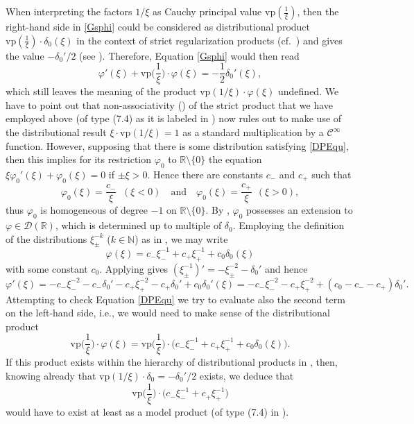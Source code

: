 \documentclass[sumlimits,intlimits,namelimits%
]{amsart}
\def\pg{\mathhexbox278}
\newcommand{\Cinf}{\ensuremath{\mathcal{C}^\infty}}
\newcommand{\D}{\ensuremath{\mathcal{D}}}
\newcommand{\mb}[1]{\ensuremath{\mathbb{#1}}}
\newcommand{\N}{\mb{N}}
\newcommand{\R}{\mb{R}}
\newcommand{\vp}{\mathrm{vp}}
\theoremstyle{definition}
\newcommand{\beq}{\begin{equation}}
\newcommand{\eeq}{\end{equation}}
\newcommand{\de}{\delta}
\newcommand{\vphi}{\varphi}
\begin{document}
When interpreting the factors $1/\xi$ as Cauchy principal value $\vp(\frac{1}{\xi})$, then the right-hand side in \eqref{Gsphi} could be considered as distributional product $\vp(\frac{1}{\xi}) \cdot \delta_0(\xi)$ in the context of strict regularization products (cf.\ \cite[\pg 7]{O:92}) and gives the value $- \de_0'/2$ (see \cite[Equation (7.7)]{O:92}). Therefore, Equation \eqref{Gsphi}  would then read
\beq\label{DPEqu}
     \vphi'(\xi) + \vp\Big(\frac{1}{\xi}\Big) \cdot \vphi(\xi) = - \frac{1}{2} \de_0'(\xi),
\eeq
which still leaves the meaning of the product $\vp(1/\xi)  \cdot \vphi(\xi)$ undefined. We have to point out that non-associativity (\cite[Remark after Corollary 7.3]{O:92}) of the strict product that we have employed above (of type (7.4) as it is labeled in \cite{O:92}) now rules out to make use of the distributional result $\xi \cdot \vp(1/\xi) = 1$ as a standard multiplication by a $\Cinf$ function. However, supposing that there is some distribution satisfying \eqref{DPEqu}, then this implies for its restriction $\vphi_0$ to $\R\setminus \{0\}$ the equation $\xi \vphi_0'(\xi) + \vphi_0(\xi) = 0$ if $\pm \xi > 0$. Hence there are constants $c_-$ and $c_+$ such that
$$
    \vphi_0(\xi) = \frac{c_-}{\xi} \;\; (\xi < 0) \quad\text{and}\quad \vphi_0(\xi) = \frac{c_+}{\xi} \:\:(\xi > 0),
$$
thus $\vphi_0$  is homogeneous of degree $-1$ on $\R\setminus \{0\}$. By \cite[Theorem 3.2.4]{Hoermander:V1}, $\vphi_0$ possesses an extension to $\vphi \in \D(\R)$, which is determined up to multiple of $\de_0$. Employing the definition of the distributions $\xi_\pm^{-k}$ ($k \in \N$) as in \cite[Equation (3.2.5)]{Hoermander:V1}, we may write
$$
    \vphi(\xi) = c_- \xi_-^{-1} + c_+ \xi_+^{-1} + c_0 \de_0(\xi)
$$
with some constant $c_0$. Applying \cite[Equation (3.2.2)${}''$, page 69]{Hoermander:V1} gives $(\xi_\pm^{-1})' = - \xi_\pm^{-2} - \de_0'$ and hence
$$
    \vphi'(\xi) = - c_- \xi_-^{-2} - c_- \de_0'  - c_+ \xi_+^{-2}  - c_+ \de_0' + c_0 \de_0'(\xi) = 
           - c_- \xi_-^{-2} - c_+ \xi_+^{-2} + (c_0 - c_- - c_+) \de_0'.
$$
Attempting to check Equation \eqref{DPEqu} we try to evaluate also the second term on the left-hand side, i.e., we would need to make sense of the distributional product
\beq\label{DisPro}
      \vp\Big(\frac{1}{\xi}\Big) \cdot \vphi(\xi) =  \vp\Big(\frac{1}{\xi}\Big) \cdot \big( c_- \xi_-^{-1} + c_+ \xi_+^{-1} + c_0 \de_0(\xi) \big). 
\eeq
If this product exists within the hierarchy of distributional products in \cite[\pg 7, page 69]{O:92}, then, knowing already that $\vp(1/\xi) \cdot \de_0 = -\de_0'/2$ exists, we deduce that 
$$
     \vp\Big(\frac{1}{\xi}\Big) \cdot \big( c_- \xi_-^{-1} + c_+ \xi_+^{-1} \big) 
$$
would have to exist at least as a model product (of type (7.4) in \cite{O:92}). 
\end{document}
